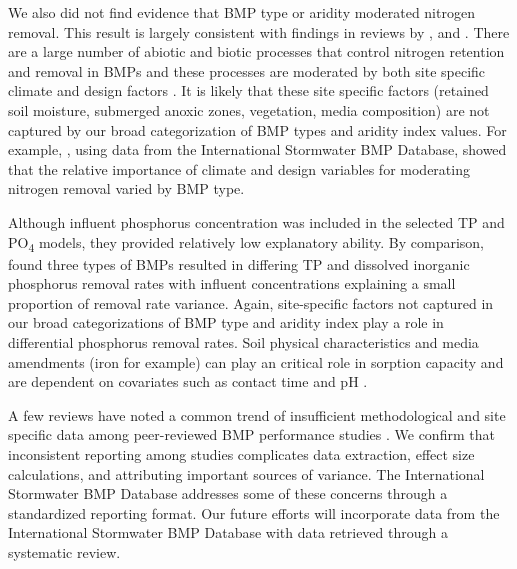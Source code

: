 \documentclass[utf8]{FrontiersinHarvard}
\begin{document}
We also did not find evidence that BMP type or aridity moderated nitrogen removal.
This result is largely consistent with findings in reviews by \citet{kochNitrogenRemovalStormwater2014}, \citet{hagerPerformanceLowimpactDevelopment2019} and \citet{horvathEffectsRegionalClimate2023}.
There are a large number of abiotic and biotic processes that control nitrogen retention and removal in BMPs and these processes are moderated by both site specific climate and design factors \citep{lefevreReviewDissolvedPollutants2015, valencaNitrateRemovalUncertainty2021}.
It is likely that these site specific factors (retained soil moisture, submerged anoxic zones, vegetation, media composition) are not captured by our broad categorization of BMP types and aridity index values.
For example, \citet{valencaNitrateRemovalUncertainty2021}, using data from the International Stormwater BMP Database, showed that the relative importance of climate and design variables for moderating nitrogen removal varied by BMP type.

Although influent phosphorus concentration was included in the selected TP and PO\textsubscript{4} models, they provided relatively low explanatory ability.
By comparison, \citet{horvathEffectsRegionalClimate2023} found three types of BMPs resulted in differing TP and dissolved inorganic phosphorus removal rates with influent concentrations explaining a small proportion of removal rate variance.
Again, site-specific factors not captured in our broad categorizations of BMP type and aridity index play a role in differential phosphorus removal rates.
Soil physical characteristics and media amendments (iron for example) can play an critical role in sorption capacity and are dependent on covariates such as contact time and pH \citep{hoganBestManagementPractices2007, lefevreReviewDissolvedPollutants2015}.

A few reviews have noted a common trend of insufficient methodological and site specific data among peer-reviewed BMP performance studies \citep{grudzinskiDoesRiparianFencing2020, eagleMetaAnalysisConstrained2017, liuReviewEffectivenessBest2017}.
We confirm that inconsistent reporting among studies complicates data extraction, effect size calculations, and attributing important sources of variance.
The International Stormwater BMP Database addresses some of these concerns through a standardized reporting format.
Our future efforts will incorporate data from the International Stormwater BMP Database with data retrieved through a systematic review.
\end{document}
